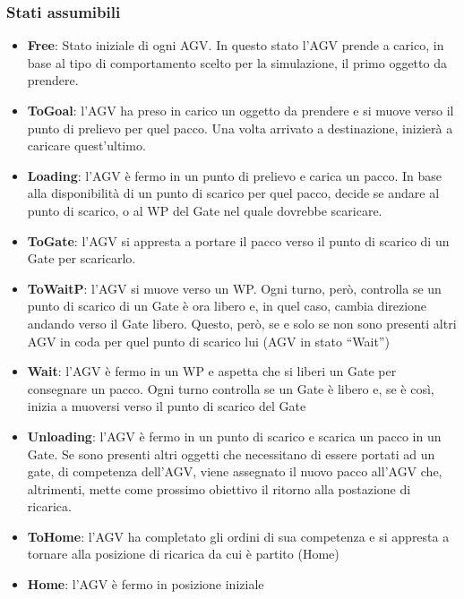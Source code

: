 \documentclass[12pt]{article}
\begin{document}
\subsubsection{Stati assumibili}
\begin{itemize}
    \item \textbf{Free}: Stato iniziale di ogni AGV. In questo stato l’AGV prende a carico, in base al tipo di comportamento scelto per la simulazione, il primo oggetto da prendere.
    \item \textbf{ToGoal}: l’AGV ha preso in carico un oggetto da prendere e si muove verso il punto di prelievo per quel pacco. Una volta arrivato a destinazione, inizierà a caricare quest’ultimo.
    \item \textbf{Loading}: l’AGV è fermo in un punto di prelievo e carica un pacco. In base alla disponibilità di un punto di scarico per quel pacco, decide se andare al punto di scarico, o al WP del Gate nel quale dovrebbe scaricare.
    \item \textbf{ToGate}: l’AGV si appresta a portare il pacco verso il punto di scarico di un Gate per scaricarlo.
    \item \textbf{ToWaitP}: l’AGV si muove verso un WP. Ogni turno, però, controlla se un punto di scarico di un Gate è ora libero e, in quel caso, cambia direzione andando verso il Gate libero. Questo, però, se e solo se non sono presenti altri AGV in coda  per quel punto di scarico lui (AGV in stato “Wait”)
    \item \textbf{Wait}: l’AGV è fermo in un WP e aspetta che si liberi un Gate per consegnare un pacco. Ogni turno controlla se un Gate è libero e, se è così, inizia a muoversi verso il punto di scarico del Gate
    \item \textbf{Unloading}:  l’AGV è fermo in un punto di scarico e scarica un pacco in un Gate. Se sono presenti altri oggetti che necessitano di essere portati ad un gate, di competenza dell’AGV, viene assegnato il nuovo pacco all’AGV che, altrimenti, mette come prossimo obiettivo il ritorno alla postazione di ricarica.
    \item \textbf{ToHome}: l’AGV ha completato gli ordini di sua competenza e si appresta a tornare alla posizione di ricarica da cui è partito (Home)
    \item \textbf{Home}: l’AGV è fermo in posizione iniziale
\end{itemize}

\newpage
\end{document}
